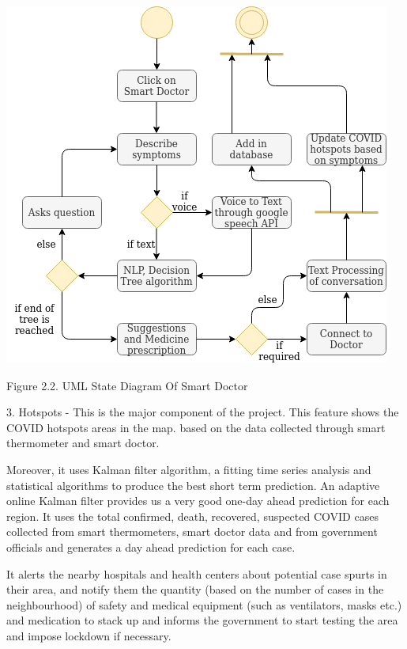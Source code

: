 \documentclass[10pt,twocolumn,letterpaper]{article}
\begin{document}
\begin{center}
\includegraphics[width=1\linewidth]{uml_state_diagram.png}
\caption{Figure 2.2. UML State Diagram Of Smart Doctor}
\end{center}


3. Hotspots - This is the major component of the project. This feature shows the COVID hotspots areas in the map. based on the data collected through smart thermometer and smart doctor.~\cite{smart-thermometer}


Moreover, it uses Kalman filter algorithm, a fitting time series analysis and statistical algorithms to produce the best short term prediction. An adaptive online Kalman filter provides us a very good one-day ahead prediction for each region. It uses the total  confirmed, death, recovered, suspected COVID cases collected from smart thermometers, smart doctor data and from government officials and generates a day ahead prediction for each case.~\cite{kalman-filter}


It alerts the nearby hospitals and health centers about potential case spurts in their area, and notify them the quantity (based on the number of cases in the neighbourhood) of safety and medical equipment (such as ventilators, masks etc.) and medication to stack up and informs the government to start testing the area and impose lockdown if necessary.

\end{document}
